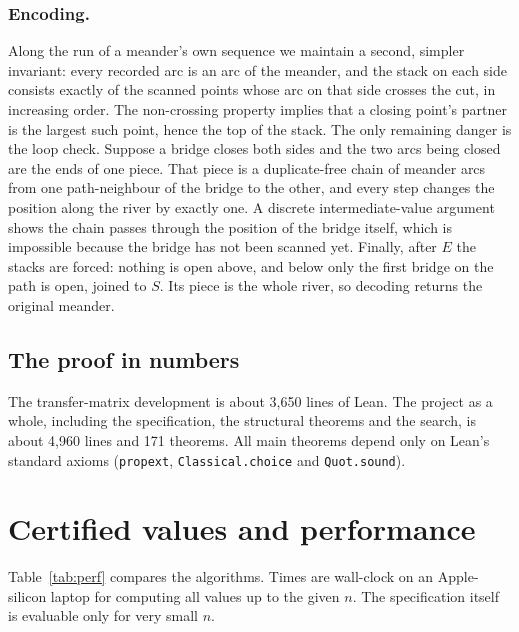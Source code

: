 \documentclass[11pt]{amsart}
\theoremstyle{definition}
\theoremstyle{remark}
\newcommand{\code}[1]{\texttt{#1}}
\begin{document}
\subsubsection*{Encoding.}
Along the run of a meander's own sequence we maintain a second, simpler invariant: every
recorded arc is an arc of the meander, and the stack on each side consists exactly of the
scanned points whose arc on that side crosses the cut, in increasing order. The non-crossing
property implies that a closing point's partner is the largest such point, hence the top of the
stack. The only remaining danger is the loop check. Suppose a bridge closes both sides and the
two arcs being closed are the ends of one piece. That piece is a duplicate-free chain of
meander arcs from one path-neighbour of the bridge to the other, and every step changes the
position along the river by exactly one. A discrete intermediate-value argument shows the chain
passes through the position of the bridge itself, which is impossible because the bridge has
not been scanned yet. Finally, after $E$ the stacks are forced: nothing is open above, and
below only the first bridge on the path is open, joined to $S$. Its piece is the whole river,
so decoding returns the original meander.

\subsection{The proof in numbers}
The transfer-matrix development is about 3{,}650 lines of Lean. The project as a whole,
including the specification, the structural theorems and the search, is about 4{,}960 lines and
171 theorems. All main theorems depend only on Lean's standard axioms (\code{propext},
\code{Classical.choice} and \code{Quot.sound}).

\section{Certified values and performance}\label{sec:values}

Table~\ref{tab:perf} compares the algorithms. Times are wall-clock on an Apple-silicon laptop
for computing all values up to the given $n$. The specification itself is evaluable only for
very small $n$.
\end{document}
